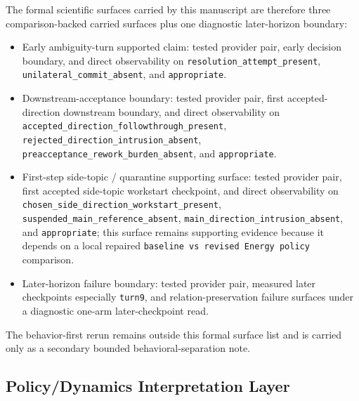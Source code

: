 \documentclass[11pt]{article}
\begin{document}
The formal scientific surfaces carried by this manuscript are therefore three
comparison-backed carried surfaces plus one diagnostic later-horizon boundary:
\begin{itemize}
\item Early ambiguity-turn supported claim: tested provider pair, early
decision boundary, and direct observability on
\texttt{resolution\_attempt\_present}, \texttt{unilateral\_commit\_absent}, and
\texttt{appropriate}.
\item Downstream-acceptance boundary: tested provider pair, first accepted-
direction downstream boundary, and direct observability on
\texttt{accepted\_direction\_followthrough\_present},
\texttt{rejected\_direction\_intrusion\_absent},
\texttt{preacceptance\_rework\_burden\_absent}, and \texttt{appropriate}.
\item First-step side-topic / quarantine supporting surface: tested provider
pair, first accepted side-topic workstart checkpoint, and direct observability on
\texttt{chosen\_side\_direction\_workstart\_present},
\texttt{suspended\_main\_reference\_absent},
\texttt{main\_direction\_intrusion\_absent}, and \texttt{appropriate}; this
surface remains supporting evidence because it depends on a local repaired
\texttt{baseline vs revised Energy policy} comparison.
\item Later-horizon failure boundary: tested provider pair, measured later
  checkpoints especially \texttt{turn9}, and relation-preservation failure
  surfaces under a diagnostic one-arm later-checkpoint read.
\end{itemize}

The behavior-first rerun remains outside this formal surface list and is
carried only as a secondary bounded behavioral-separation note.

\subsection{Policy/Dynamics Interpretation Layer}
\end{document}
